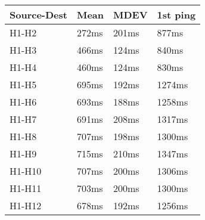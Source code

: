 \documentclass[a4paper, 11pt, oneside]{article}
\begin{document}
\begin{table}[]
\centering
\begin{tabular}{|l|l|l|l|}
\hline
\multicolumn{1}{|c|}{\textbf{Source-Dest}} & \multicolumn{1}{c|}{\textbf{Mean}} & \multicolumn{1}{c|}{\textbf{MDEV}} & \multicolumn{1}{c|}{\textbf{1st ping}} \\ \hline
H1-H2                                      & 272ms                              & 201ms                              & 877ms                                 \\ \hline
H1-H3                                      & 466ms                              & 124ms                              & 840ms                                 \\ \hline
H1-H4                                      & 460ms                              & 124ms                              & 830ms                                 \\ \hline
H1-H5                                      & 695ms                              & 192ms                              & 1274ms                                 \\ \hline
H1-H6                                      & 693ms                              & 188ms                              & 1258ms                                 \\ \hline
H1-H7                                      & 691ms                              & 208ms                              & 1317ms                                 \\ \hline
H1-H8                                      & 707ms                              & 198ms                              & 1300ms                                 \\ \hline
H1-H9                                      & 715ms                              & 210ms                              & 1347ms                                 \\ \hline
H1-H10                                      & 707ms                              & 200ms                              & 1306ms                                 \\ \hline
H1-H11                                     & 703ms                              & 200ms                              & 1300ms                                 \\ \hline
H1-H12                                     & 678ms                              & 192ms                              & 1256ms                                 \\ \hline

\end{tabular}
\end{table}
\end{document}
